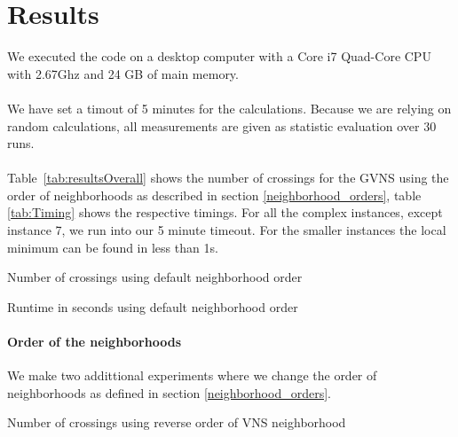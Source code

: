 \documentclass{scrartcl}
\begin{document}
\section{Results}

We executed the code on a desktop computer with a Core i7 Quad-Core
CPU with 2.67Ghz and 24 GB of main memory. 

\paragraph{}
We have set a timout of 5 minutes for the calculations.
Because we are relying on random calculations, all measurements are given as 
statistic evaluation over 30 runs.


\paragraph{}
Table~\ref{tab:resultsOverall} shows the number of crossings
for the GVNS using the order of neighborhoods as described in section \ref{neighborhood_orders}, 
table  \ref{tab:Timing} shows the respective timings.
For all the complex instances, except instance 7, we run into our 5 minute timeout. For 
the smaller instances the local minimum can be found in less than 1s.

\begin{table}[H]
  \centering
  \scriptsize
  
\caption{Number of crossings using default neighborhood order}
\label{tab:resultsOverall}
\end{table}

\begin{table}[H]
  \centering
  \scriptsize
  
\caption{Runtime in seconds using default neighborhood order}
\label{tab:Timing}
\end{table}


\paragraph{Order of the neighborhoods}

We make two addittional experiments where we change the order of neighborhoods as defined
in section \ref{neighborhood_orders}.


\begin{table}[H]
  \centering
  \scriptsize
  
\caption{Number of crossings using reverse order of VNS neighborhood}
\label{tab:resultsVns}
\end{table}
\end{document}
